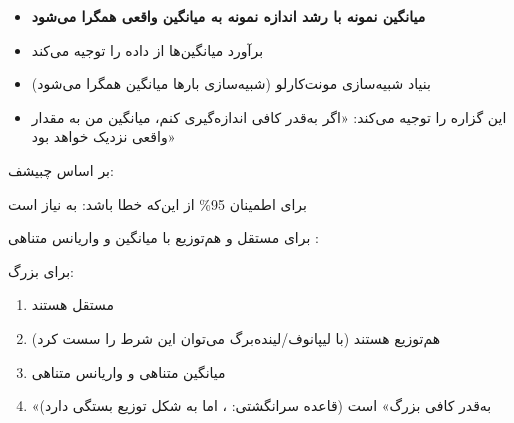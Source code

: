 
\begin{itemize}
\tightlist
\item
  \textbf{میانگین نمونه با رشد اندازه نمونه به میانگین واقعی همگرا می‌شود}
\item
  برآورد میانگین‌ها از داده را توجیه می‌کند
\item
  بنیاد شبیه‌سازی مونت‌کارلو (شبیه‌سازی بارها \lr{\mbox{\ensuremath{\to}}} میانگین همگرا می‌شود)
\item
  این گزاره را توجیه می‌کند: «اگر به‌قدر کافی اندازه‌گیری کنم، میانگین من به مقدار واقعی نزدیک خواهد بود»
\end{itemize}


بر اساس چبیشف: 

برای اطمینان 95\% از این‌که خطا \lr{$< \varepsilon$} باشد: به  نیاز است



برای  مستقل و هم‌توزیع  با میانگین \lr{$\mu$} و واریانس متناهی :



برای  بزرگ:



\begin{enumerate}
\def\labelenumi{\arabic{enumi}.}
\tightlist
\item
   مستقل هستند
\item
  هم‌توزیع هستند (با  لیپانوف/لینده‌برگ می‌توان این شرط را سست کرد)
\item
  میانگین متناهی \lr{$\mu$} و واریانس متناهی 
\item
   «به‌قدر کافی بزرگ» است (قاعده سرانگشتی: ، اما به شکل توزیع بستگی دارد)
\end{enumerate}

